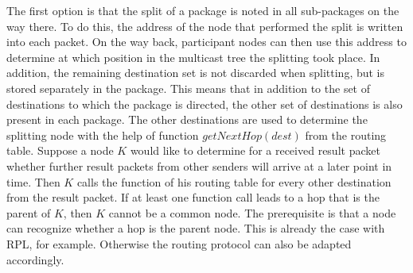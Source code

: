 \documentclass[english,version-2019-11]{uzl-thesis}
\begin{document}
The first option is that the split of a package is noted in all sub-packages on the way there. To do this, the address of the node that performed the split is written into each packet. On the way back, participant nodes can then use this address to determine at which position in the multicast tree the splitting took place. In addition, the remaining destination set is not discarded when splitting, but is stored separately in the package. This means that in addition to the set of destinations to which the package is directed, the other set of destinations is also present in each package. The other destinations are used to determine the splitting node with the help of function $getNextHop(dest)$ from the routing table. Suppose a node $K$ would like to determine for a received result packet whether further result packets from other senders will arrive at a later point in time. Then $K$ calls the function of his routing table for every other destination from the result packet. If at least one function call leads to a hop that is the parent of $K$, then $K$ cannot be a common node. The prerequisite is that a node can recognize whether a hop is the parent node. This is already the case with RPL, for example. Otherwise the routing protocol can also be adapted accordingly.
\end{document}
